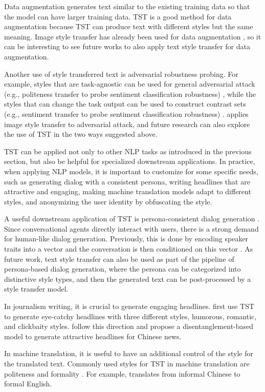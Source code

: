 Data augmentation generates text similar to the existing training data so that the model can have larger training data. TST is a good method for data augmentation because TST can produce text with different styles but the same meaning. Image style transfer has already been used for data augmentation , so it can be interesting to see future works to also apply text style transfer for data augmentation.

Another use of style transferred text is adversarial robustness probing. For example, styles that are task-agnostic can be used for general adversarial attack (e.g., politeness transfer to probe sentiment classification robustness) , while the styles that can change the task output can be used to construct contrast sets (e.g., sentiment transfer to probe sentiment classification robustness) .
 applies image style transfer to adversarial attack, and future research can also explore the use of TST in the two ways suggested above.

\label{sec:downstream}
TST can be applied not only to other NLP tasks as introduced in the previous section, but also be helpful for specialized downstream applications. In practice, when applying NLP models, it is important to customize for some specific needs, such as generating dialog with a consistent persona, writing headlines that are attractive and engaging,
making machine translation models adapt to different styles, and anonymizing the user identity by obfuscating the style.

A useful downstream application of TST is persona-consistent dialog generation . Since conversational agents directly interact with users, there is a strong demand for human-like dialog generation. Previously, this is done by encoding speaker traits into a vector and the conversation is then conditioned on this vector . As future work, text style transfer can also be used as part of the pipeline of persona-based dialog generation, where the persona can be categorized into distinctive style types, and then the generated text can be post-processed by a style transfer model.

In journalism writing, it is crucial to generate engaging headlines.   first use TST to generate eye-catchy headlines with three different styles, humorous, romantic, and clickbaity styles.  follow this direction and propose a disentanglement-based model to generate attractive headlines for Chinese news.

In machine translation, it is useful to have an additional control of the style for the translated text. Commonly used styles for TST in machine translation are  politeness  and formality . For example,  translates from informal Chinese to formal English.

